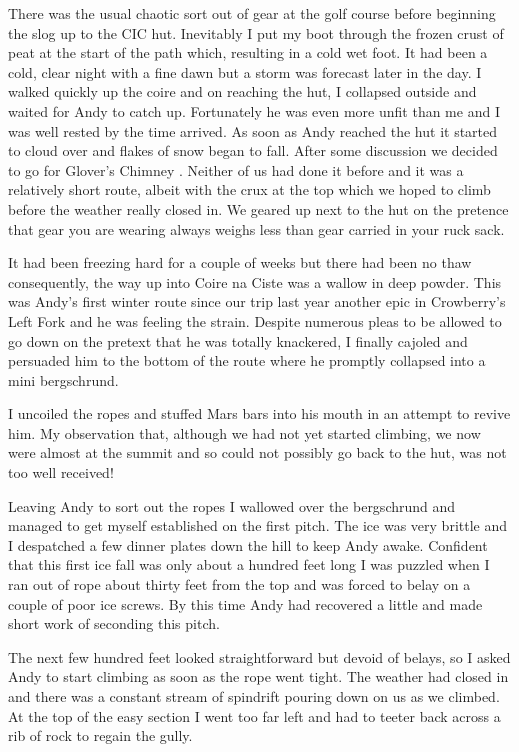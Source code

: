 \documentclass[a5paper,openany,font 10pt]{scrbook}
\begin{document}
There was the usual chaotic sort out of gear at the golf
course before beginning the slog up to the CIC hut. Inevitably I put
my boot through the frozen crust of peat at the start of the path
which, resulting in a cold wet foot. It had been a cold, clear night
with a fine dawn but a storm was forecast later in the day.  I walked
quickly up the coire and on reaching the hut, I collapsed outside and
waited for Andy to catch up. Fortunately he was even more unfit than
me and I was well rested by the time arrived. As soon as Andy reached
the hut it started to cloud over and flakes of snow began to
fall. After some discussion we decided to go for Glover's Chimney
. Neither of us had done it before and it was a relatively short
route, albeit with the crux at the top which we hoped to climb before
the weather really closed in. We geared up next to the hut on the
pretence that gear you are wearing always weighs less than gear
carried in your ruck sack.

It had been freezing hard for a couple of weeks but there had
been no thaw consequently, the way up into Coire na Ciste was a wallow
in deep powder. This was Andy's first winter route since our trip last
year another epic in Crowberry's Left Fork and he was feeling the
strain. Despite numerous pleas to be allowed to go down on the pretext
that he was totally knackered, I finally cajoled and persuaded him to
the bottom of the route where he promptly collapsed into a mini
bergschrund.

I uncoiled the ropes and stuffed Mars bars into his mouth in
an attempt to revive him. My observation that, although we had not yet
started climbing, we now were almost at the summit and so could not
possibly go back to the hut, was not too well received!

Leaving Andy to sort out the ropes I wallowed over the
bergschrund and managed to get myself established on the first
pitch. The ice was very brittle and I despatched a few dinner plates
down the hill to keep Andy awake. Confident that this first ice fall
was only about a hundred feet long I was puzzled when I ran out of
rope about thirty feet from the top and was forced to belay on a
couple of poor ice screws. By this time Andy had recovered a little
and made short work of seconding this pitch.

The next few hundred feet looked straightforward but devoid of
belays, so I asked Andy to start climbing as soon as the rope went
tight. The weather had closed in and there was a constant stream of
spindrift pouring down on us as we climbed. At the top of the easy
section I went too far left and had to teeter back across a rib of
rock to regain the gully.
\end{document}
